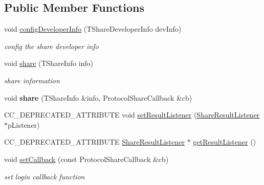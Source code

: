 \subsection*{Public Member Functions}
\begin{DoxyCompactItemize}
\item 
void \hyperlink{classcocos2d_1_1plugin_1_1ProtocolShare_a505828f74fcd6f349ddb9a46cc5b381a}{config\+Developer\+Info} (T\+Share\+Developer\+Info dev\+Info)
\begin{DoxyCompactList}\small\item\em config the share developer info \end{DoxyCompactList}\item 
void \hyperlink{classcocos2d_1_1plugin_1_1ProtocolShare_ac56cbc9a0aa15c6d9ec3c352866e1b5c}{share} (T\+Share\+Info info)
\begin{DoxyCompactList}\small\item\em share information \end{DoxyCompactList}\item 
\mbox{\label{classcocos2d_1_1plugin_1_1ProtocolShare_a310a8bf0809b9d091bc9451feb3ba023}} 
void {\bfseries share} (T\+Share\+Info \&info, Protocol\+Share\+Callback \&cb)
\item 
C\+C\+\_\+\+D\+E\+P\+R\+E\+C\+A\+T\+E\+D\+\_\+\+A\+T\+T\+R\+I\+B\+U\+TE void \hyperlink{classcocos2d_1_1plugin_1_1ProtocolShare_a1dbb7ad2d96a9c5f222ad992e664f71b}{set\+Result\+Listener} (\hyperlink{classcocos2d_1_1plugin_1_1ShareResultListener}{Share\+Result\+Listener} $\ast$p\+Listener)
\item 
C\+C\+\_\+\+D\+E\+P\+R\+E\+C\+A\+T\+E\+D\+\_\+\+A\+T\+T\+R\+I\+B\+U\+TE \hyperlink{classcocos2d_1_1plugin_1_1ShareResultListener}{Share\+Result\+Listener} $\ast$ \hyperlink{classcocos2d_1_1plugin_1_1ProtocolShare_a83af809aea16835dffb1de25576b01ac}{get\+Result\+Listener} ()
\item 
\mbox{\label{classcocos2d_1_1plugin_1_1ProtocolShare_a94ed38104b5ecfac2aa7b221e5c1aa60}} 
void \hyperlink{classcocos2d_1_1plugin_1_1ProtocolShare_a94ed38104b5ecfac2aa7b221e5c1aa60}{set\+Callback} (const Protocol\+Share\+Callback \&cb)
\begin{DoxyCompactList}\small\item\em set login callback function \end{DoxyCompactList}\item 

\end{DoxyCompactItemize}

